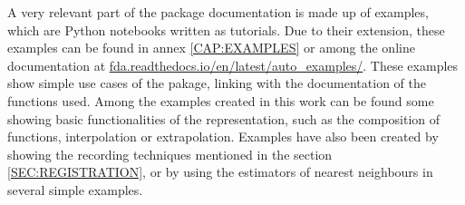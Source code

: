 A very relevant part of the package documentation is made up of examples,
which are Python notebooks written as tutorials. Due to their extension, these
examples can be found in annex \ref{CAP:EXAMPLES} or among the online documentation
at \href{https://fda.readthedocs.io/en/latest/auto_examples/}{fda.readthedocs.io/en/latest/auto\_examples/}.
These examples show simple use cases of the pakage, linking with the documentation of the functions used. Among the examples created in this work can be found some showing basic functionalities of the representation, such as the composition of functions, interpolation or extrapolation. Examples have also been created by showing the recording techniques mentioned in the section \ref{SEC:REGISTRATION}, or by using the estimators of nearest neighbours in several simple examples.
